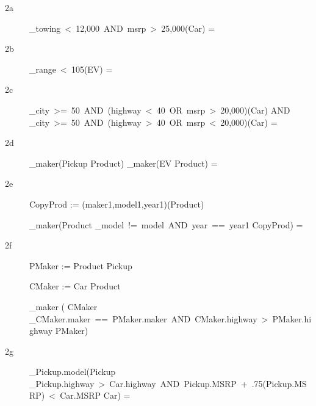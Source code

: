 \documentclass[12pt]{article}
\begin{document}
\begin{description}
\item[2a ] $ $ \\

\sigma_{towing\ <\ 12,000\  AND\ msrp\ >\ 25,000}(Car) = \emptyset

\clearpage
\item[2b ] $ $ \\

\sigma_{range\ <\ 105}(EV) = \emptyset

\clearpage
\item[2c ] $ $ \\

\sigma_{city\ >=\ 50\ AND\ (highway\ <\ 40\ OR\ msrp\ >\ 20,000)}(Car) AND \sigma_{city\ >=\ 50\ AND\ (highway\ >\ 40\ OR\ msrp\ <\ 20,000)}(Car) = \emptyset 

\clearpage
\item[2d ] $ $ \\

\pi_{maker}(Pickup \bowtie Product) \bowtie \pi_{maker}(EV \bowtie Product) = \emptyset

\clearpage
\item[2e ] $ $ \\

CopyProd := \rho(maker1,model1,year1)(Product)

\pi_{maker}(Product \bowtie_{model\ !=\ model\ AND\ year\ ==\ year1} CopyProd) = \emptyset

\clearpage
\item[2f ] $ $ \\

PMaker := Product \bowtie Pickup

CMaker := Car \bowtie Product

\pi_{maker} ( CMaker \bowtie_{CMaker.maker\ ==\ PMaker.maker\ AND\ CMaker.highway\ >\ PMaker.highway} PMaker)


\clearpage
\item[2g ] $ $ \\

\pi_{Pickup.model}(Pickup \bowtie_{Pickup.highway\ >\ Car.highway\ AND\ Pickup.MSRP\ +\ .75(Pickup.MSRP)\ <\ Car.MSRP} Car) = \emptyset


\clearpage
\end{description}
\end{document}
